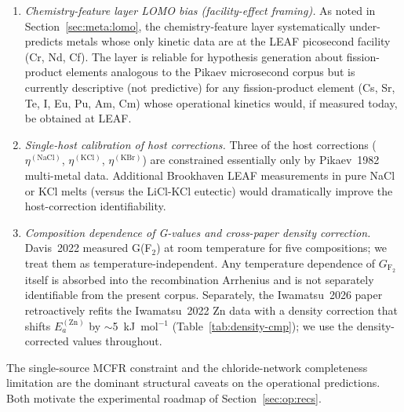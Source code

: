 \documentclass[11pt]{article}
\theoremstyle{plain}
\theoremstyle{definition}
\theoremstyle{remark}
\newcommand{\Ea}{E_a}
\begin{document}
\begin{sloppypar}
\begin{enumerate}
      the operational propagation; if the rate-limiting step changes
      between regimes, the extrapolation may miss by an order of
      magnitude.
\item \emph{Chemistry-feature layer LOMO bias (facility-effect framing).}
      As noted in Section~\ref{sec:meta:lomo}, the chemistry-feature
      layer systematically under-predicts metals whose only kinetic data
      are at the LEAF picosecond facility (Cr, Nd, Cf).  The layer is
      reliable for hypothesis generation about fission-product elements
      analogous to the Pikaev microsecond corpus but is currently
      descriptive (not predictive) for any fission-product element
      (Cs, Sr, Te, I, Eu, Pu, Am, Cm) whose operational kinetics would,
      if measured today, be obtained at LEAF.
\item \emph{Single-host calibration of host corrections.}  Three of the
      host corrections ($\eta^{(\mathrm{NaCl})}$,
      $\eta^{(\mathrm{KCl})}$, $\eta^{(\mathrm{KBr})}$) are constrained
      essentially only by Pikaev~1982 multi-metal data.  Additional
      Brookhaven LEAF measurements in pure NaCl or KCl melts (versus the
      LiCl-KCl eutectic) would dramatically improve the host-correction
      identifiability.
\item \emph{Composition dependence of G-values and cross-paper density
      correction.}  Davis~2022 measured G(F$_2$) at room temperature for
      five compositions; we treat them as temperature-independent.  Any
      temperature dependence of $G_{\mathrm{F}_2}$ itself is absorbed
      into the recombination Arrhenius and is not separately identifiable
      from the present corpus.  Separately, the Iwamatsu~2026 paper
      retroactively refits the Iwamatsu~2022 Zn data with a density
      correction that shifts $\Ea^{(\mathrm{Zn})}$ by $\sim$5~kJ~mol$^{-1}$
      (Table~\ref{tab:density-cmp}); we use the density-corrected values
      throughout.
\end{enumerate}
\end{sloppypar}

The single-source MCFR constraint and the chloride-network completeness
limitation are the dominant structural caveats on the operational
predictions.  Both motivate the experimental roadmap of
Section~\ref{sec:op:recs}.
\end{document}
